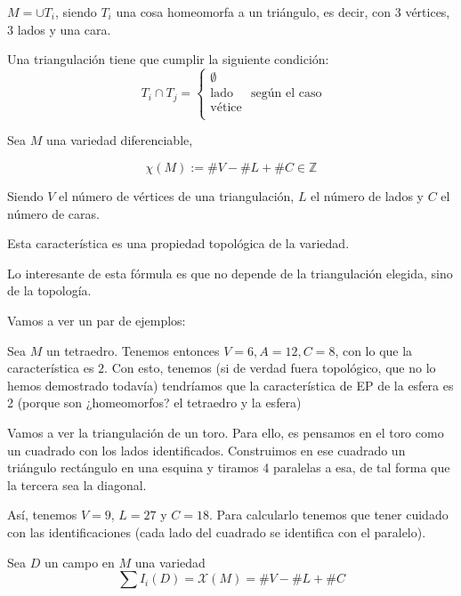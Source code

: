 \begin{defn}[Triangulación]  $M=∪T_i$, siendo $T_i$ una cosa homeomorfa a un triángulo, es decir, con 3 vértices, 3 lados y una cara.

Una triangulación tiene que cumplir la siguiente condición:
\[
T_i ∩ T_j = \begin{cases}
\emptyset\\
\text{lado}\\
\text{vétice}\\
\end{cases}
\text{ según el caso}\]
\end{defn}


\begin{defn}
Sea $M$ una variedad diferenciable,

$$\chi(M) := \#V - \#L + \#C ∈ℤ$$

Siendo $V$ el número de vértices de una triangulación, $L$ el número de lados y $C$ el número de caras.


Esta característica es una propiedad topológica de la variedad.
\end{defn}

Lo interesante de esta fórmula es que no depende de la triangulación elegida, sino de la topología.

Vamos a ver un par de ejemplos:

\begin{example}
Sea $M$ un tetraedro. Tenemos entonces $V=6,A=12,C=8$, con lo que la característica es $2$. Con esto, tenemos (si de verdad fuera topológico, que no lo hemos demostrado todavía) tendríamos que la característica de EP de la esfera es 2 (porque son ¿homeomorfos? el tetraedro y la esfera)
\end{example}

\begin{example}

Vamos a ver la triangulación de un toro. Para ello, es pensamos en el toro como un cuadrado con los lados identificados. Construimos en ese cuadrado un triángulo rectángulo en una esquina y tiramos 4 paralelas a esa, de tal forma que la tercera sea la diagonal.

Así, tenemos $V=9$, $L=27$ y $C=18$. Para calcularlo tenemos que tener cuidado con las identificaciones (cada lado del cuadrado se identifica con el paralelo).
\end{example}


\begin{theorem}[Poincaré]
Sea $D$ un campo en $M$ una variedad
\[
\sum I_i(D) = \mathcal{X}(M) = \#V - \#L + \#C
\]

\end{theorem}

